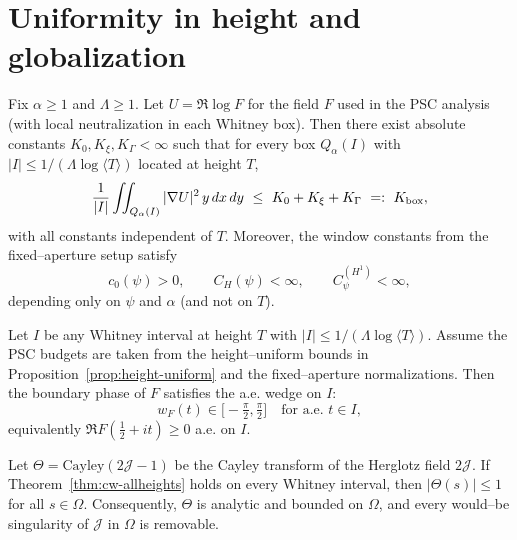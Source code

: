 
\section*{Uniformity in height and globalization}

\begin{proposition}\label{prop:height-uniform}
Fix $\alpha\ge 1$ and $\Lambda\ge 1$.
Let $U=\Re\log F$ for the field $F$ used in the PSC analysis (with local neutralization in each Whitney box).
Then there exist absolute constants $K_0,K_\xi,K_\Gamma<\infty$ such that for every box $Q_\alpha(I)$ with $|I|\le 1/(\Lambda\log\langle T\rangle)$ located at height $T$,
\[
  \frac{1}{|I|}\iint_{Q_\alpha(I)} |\nabla U|^2\,y\,dx\,dy\ \le\ K_0+K_\xi+K_\Gamma\ =:\ K_{\rm box},
\]
with all constants independent of $T$.
Moreover, the window constants from the fixed–aperture setup satisfy
\[
  c_0(\psi)>0,\qquad C_H(\psi)<\infty,\qquad C_\psi^{(H^1)}<\infty,
\]
depending only on $\psi$ and $\alpha$ (and not on $T$).
\end{proposition}

\begin{theorem}\label{thm:cw-allheights}
Let $I$ be any Whitney interval at height $T$ with $|I|\le 1/(\Lambda\log\langle T\rangle)$.
Assume the PSC budgets are taken from the height–uniform bounds in Proposition~\ref{prop:height-uniform} and the fixed–aperture normalizations.
Then the boundary phase of $F$ satisfies the a.e. wedge on $I$:
\[
  w_F(t)\in\bigl[-\tfrac{\pi}{2},\tfrac{\pi}{2}\bigr]\quad\text{for a.e. }t\in I,
\]
equivalently $\Re F(\tfrac12+it)\ge 0$ a.e. on $I$.
\end{theorem}

\begin{theorem}\label{thm:schur-global}
Let $\Theta=\mathrm{Cayley}(2\mathcal J-1)$ be the Cayley transform of the Herglotz field $2\mathcal J$.
If Theorem~\ref{thm:cw-allheights} holds on every Whitney interval, then $|\Theta(s)|\le 1$ for all $s\in\Omega$.
Consequently, $\Theta$ is analytic and bounded on $\Omega$, and every would–be singularity of $\mathcal J$ in $\Omega$ is removable.
\end{theorem}


